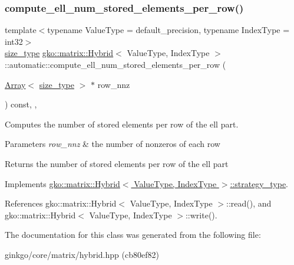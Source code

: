 \subsubsection{\texorpdfstring{compute\+\_\+ell\+\_\+num\+\_\+stored\+\_\+elements\+\_\+per\+\_\+row()}{compute\_ell\_num\_stored\_elements\_per\_row()}}
{\footnotesize\ttfamily template$<$typename Value\+Type = default\+\_\+precision, typename Index\+Type = int32$>$ \\
\hyperlink{namespacegko_a6e5c95df0ae4e47aab2f604a22d98ee7}{size\+\_\+type} \hyperlink{classgko_1_1matrix_1_1Hybrid}{gko\+::matrix\+::\+Hybrid}$<$ Value\+Type, Index\+Type $>$\+::automatic\+::compute\+\_\+ell\+\_\+num\+\_\+stored\+\_\+elements\+\_\+per\+\_\+row (\begin{DoxyParamCaption}\item[{\hyperlink{classgko_1_1Array}{Array}$<$ \hyperlink{namespacegko_a6e5c95df0ae4e47aab2f604a22d98ee7}{size\+\_\+type} $>$ $\ast$}]{row\+\_\+nnz }\end{DoxyParamCaption}) const\hspace{0.3cm}{\ttfamily [inline]}, {\ttfamily [override]}, {\ttfamily [virtual]}}



Computes the number of stored elements per row of the ell part. 


\begin{DoxyParams}{Parameters}
{\em row\+\_\+nnz} & the number of nonzeros of each row\\
\hline
\end{DoxyParams}
\begin{DoxyReturn}{Returns}
the number of stored elements per row of the ell part 
\end{DoxyReturn}


Implements \hyperlink{classgko_1_1matrix_1_1Hybrid_1_1strategy__type_a0a0cd4024f27c7d0f286f35fc0a6de60}{gko\+::matrix\+::\+Hybrid$<$ Value\+Type, Index\+Type $>$\+::strategy\+\_\+type}.



References gko\+::matrix\+::\+Hybrid$<$ Value\+Type, Index\+Type $>$\+::read(), and gko\+::matrix\+::\+Hybrid$<$ Value\+Type, Index\+Type $>$\+::write().



The documentation for this class was generated from the following file\+:\begin{DoxyCompactItemize}
\item 
ginkgo/core/matrix/hybrid.\+hpp (cb80ef82)\end{DoxyCompactItemize}
